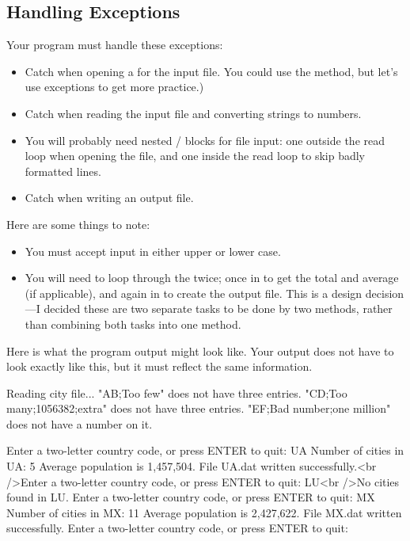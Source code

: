 \begin{exercise}
\subsection{Handling Exceptions}

Your program must handle these exceptions:

\begin{itemize}
    \item Catch when opening a  for the input file. You could use the  method, but let's use exceptions to get more practice.)
    \item Catch  when reading the input file and converting strings to numbers.
    \item You will probably need nested / blocks for file input: one outside the read loop when opening the file, and one inside the read loop to skip badly formatted lines.
    \item Catch  when writing an output file.
\end{itemize}

Here are some things to note:

\begin{itemize}
    \item You must accept input in either upper or lower case.
    \item You will need to loop through the  twice; once in  to get the total and average (if applicable), and again in  to create the output file. This is a design decision---I decided these are two separate tasks to be done by two methods, rather than combining both tasks into one method.
\end{itemize}

Here is what the program output might look like. Your output does not have to look exactly like this, but it must reflect the same information.

\begin{stdout}
Reading city file...
"AB;Too few" does not have three entries.
"CD;Too many;1056382;extra" does not have three entries.
"EF;Bad number;one million" does not have a number on it.

Enter a two-letter country code, or press ENTER to quit: UA
Number of cities in UA: 5
Average population is 1,457,504.
File UA.dat written successfully.<br />Enter a two-letter country code, or press ENTER to quit: LU<br />No cities found in LU.
Enter a two-letter country code, or press ENTER to quit: MX
Number of cities in MX: 11
Average population is 2,427,622.
File MX.dat written successfully.
Enter a two-letter country code, or press ENTER to quit: 
\end{stdout}


\end{exercise}
